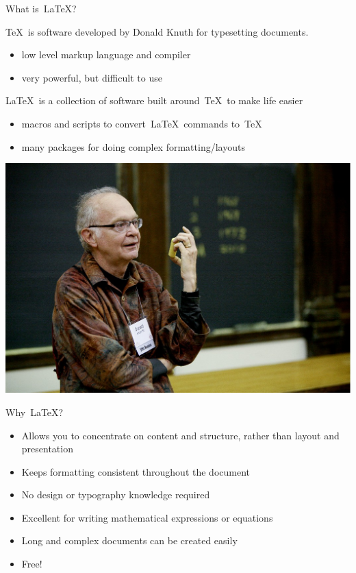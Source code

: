 \documentclass[mathserif]{beamer}
\begin{document}
\begin{frame}{What is~\LaTeX?}

\TeX\ is software developed by Donald Knuth for typesetting documents.

\begin{itemize}
	\item low level markup language and compiler
	\item very powerful, but difficult to use
\end{itemize}
\vfill

\LaTeX\ is a collection of software built around~\TeX\ to make life easier
\begin{itemize}
	\item macros and scripts to convert~\LaTeX\ commands to~\TeX
	\item many packages for doing complex formatting/layouts
\end{itemize}
\vfill
\begin{center}
    \includegraphics[scale=0.22]{img/DonaldKnuth}
\end{center}
\end{frame}


\begin{frame}{Why~\LaTeX?}

\begin{itemize}
	\item Allows you to concentrate on content and structure, rather than layout and presentation
	\item Keeps formatting consistent throughout the document
	\item No design or typography knowledge required
	\item Excellent for writing mathematical expressions or equations
	\item Long and complex documents can be created easily
	\item Free!
\end{itemize}

\end{frame}
\end{document}
